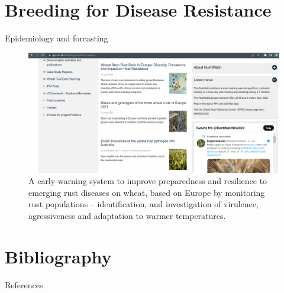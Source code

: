 \documentclass[10pt,dvipsnames,ignorenonframetext,aspectratio=169]{beamer}
\begin{document}
\begin{frame}{}
\protect\hypertarget{section-1}{}
\end{frame}

\hypertarget{breeding-for-disease-resistance}{%
\section{Breeding for Disease
Resistance}\label{breeding-for-disease-resistance}}

\begin{frame}{Epidemiology and forcasting}
\protect\hypertarget{epidemiology-and-forcasting}{}
\begin{figure}
\includegraphics[width=0.95\linewidth]{../images/rust_epidemiology_networking_forcasting} \caption{A early-warning system to improve preparedness and resilience to emerging rust diseases on wheat, based on Europe by monitoring rust populations -- identification, and investigation of virulence, agressiveness and adaptation to warmer temperatures.}\label{fig:rust-epidemiology-network}
\end{figure}
\end{frame}

\hypertarget{bibliography}{%
\section{Bibliography}\label{bibliography}}

\begin{frame}{References}
\protect\hypertarget{references}{}
\end{frame}
\end{document}
